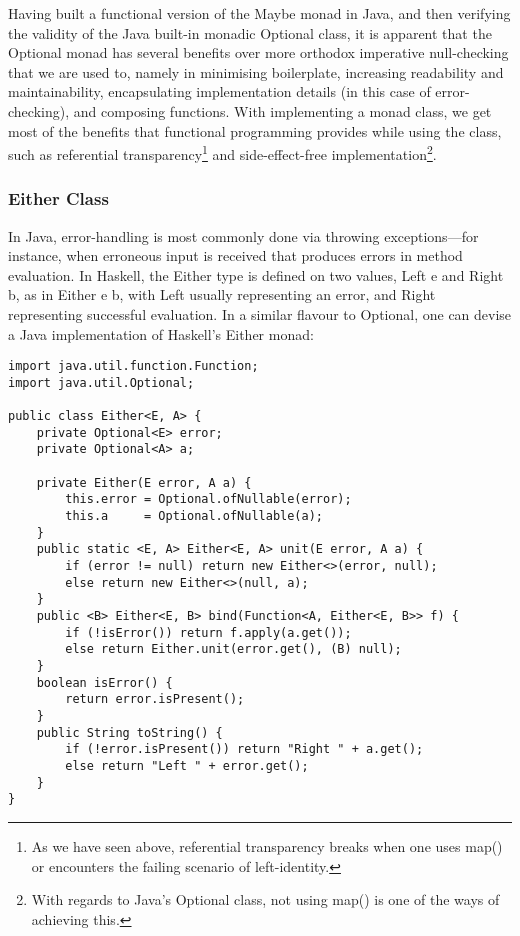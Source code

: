 Having built a functional version of the Maybe monad in Java, and then verifying the validity of the Java built-in monadic Optional class, it is apparent that the Optional monad has several benefits over more orthodox imperative null-checking that we are used to, namely in minimising boilerplate, increasing readability and maintainability, encapsulating implementation details (in this case of error-checking), and composing functions. With implementing a monad class, we get most of the benefits that functional programming provides while using the class, such as referential transparency\footnote{As we have seen above, referential transparency breaks when one uses map() or encounters the failing scenario of left-identity.} and side-effect-free implementation\footnote{With regards to Java's Optional class, not using map() is one of the ways of achieving this.}.

\subsubsection{Either Class}
\label{sec:8}

In Java, error-handling is most commonly done via throwing exceptions—for instance, when erroneous input is received that produces errors in method evaluation. In Haskell, the Either type is defined on two values, Left e and Right b, as in Either e b, with Left usually representing an error, and Right representing successful evaluation. In a similar flavour to Optional, one can devise a Java implementation \cite{result-monad-java} of Haskell's Either monad:

\begin{verbatim}
import java.util.function.Function;
import java.util.Optional;

public class Either<E, A> {
    private Optional<E> error;
    private Optional<A> a;
    
    private Either(E error, A a) {
        this.error = Optional.ofNullable(error);
        this.a     = Optional.ofNullable(a);
    }
    public static <E, A> Either<E, A> unit(E error, A a) {
        if (error != null) return new Either<>(error, null);
        else return new Either<>(null, a);
    }
    public <B> Either<E, B> bind(Function<A, Either<E, B>> f) {
        if (!isError()) return f.apply(a.get());
        else return Either.unit(error.get(), (B) null);
    }
    boolean isError() {
        return error.isPresent();
    }
    public String toString() {
        if (!error.isPresent()) return "Right " + a.get();
        else return "Left " + error.get();
    }
}
\end{verbatim}

